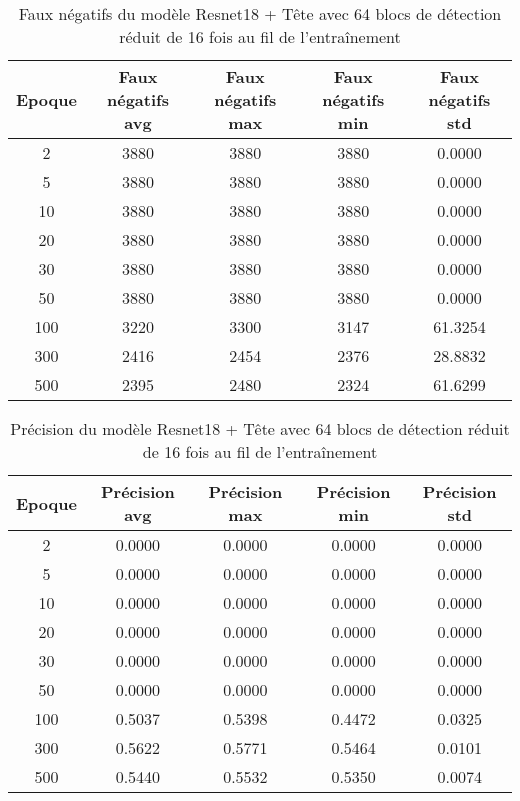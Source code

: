 \begin{table}[!ht]
    \caption{Faux négatifs du modèle Resnet18 + Tête avec 64 blocs de détection réduit de 16 fois au fil de l'entraînement}
    \label{tab:resnet18+head_64n_false_negative_reduced_16x_precision}
    \centering
    \begin{tabular}{ |c||c|c|c|c|  }
        \hline
        \rowcolor{gray!50}
        Epoque & Faux négatifs avg & Faux négatifs max & Faux négatifs min & Faux négatifs std\\
        \hline
        2 & 3880 & 3880 & 3880 & 0.0000\\
        5 & 3880 & 3880 & 3880 & 0.0000\\
        10 & 3880 & 3880 & 3880 & 0.0000\\
        20 & 3880 & 3880 & 3880 & 0.0000\\
        30 & 3880 & 3880 & 3880 & 0.0000\\
        50 & 3880 & 3880 & 3880 & 0.0000\\
        100 & 3220 & 3300 & 3147 & 61.3254\\
        300 & 2416 & 2454 & 2376 & 28.8832\\
        500 & 2395 & 2480 & 2324 & 61.6299\\
        \hline
    \end{tabular}
\end{table}

\begin{table}[!ht]
    \caption{Précision du modèle Resnet18 + Tête avec 64 blocs de détection réduit de 16 fois au fil de l'entraînement}
    \label{tab:resnet18+head_64n_reduced_16x_precision}
    \centering
    \begin{tabular}{ |c||c|c|c|c|  }
        \hline
        \rowcolor{gray!50}
        Epoque & Précision avg & Précision max & Précision min & Précision std\\
        \hline
        2 & 0.0000 & 0.0000 & 0.0000 & 0.0000\\
        5 & 0.0000 & 0.0000 & 0.0000 & 0.0000\\
        10 & 0.0000 & 0.0000 & 0.0000 & 0.0000\\
        20 & 0.0000 & 0.0000 & 0.0000 & 0.0000\\
        30 & 0.0000 & 0.0000 & 0.0000 & 0.0000\\
        50 & 0.0000 & 0.0000 & 0.0000 & 0.0000\\
        100 & 0.5037 & 0.5398 & 0.4472 & 0.0325\\
        300 & 0.5622 & 0.5771 & 0.5464 & 0.0101\\
        500 & 0.5440 & 0.5532 & 0.5350 & 0.0074\\
        \hline
    \end{tabular}
\end{table}

